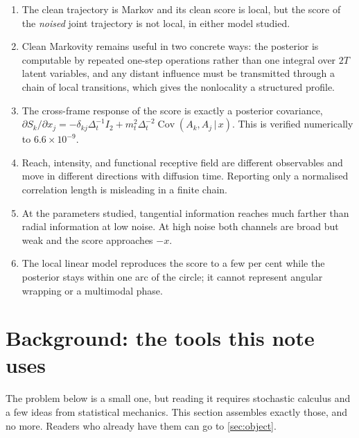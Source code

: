 \documentclass[11pt,a4paper]{article}
\newcommand{\given}{\,\vert\,}
\newcommand{\mt}{m_t}
\newcommand{\Dt}{\Delta_t}
\newcommand{\Cov}{\operatorname{Cov}}
\begin{document}
\begin{keyresult}
\begin{enumerate}[itemsep=0.15em]
\item The clean trajectory is Markov and its clean score is local, but the score of the
      \emph{noised} joint trajectory is not local, in either model studied.
\item Clean Markovity remains useful in two concrete ways: the posterior is computable by
      repeated one-step operations rather than one integral over $2T$ latent variables, and
      any distant influence must be transmitted through a chain of local transitions, which
      gives the nonlocality a structured profile.
\item The cross-frame response of the score is exactly a posterior covariance,
      $\partial S_k/\partial x_j=-\delta_{kj}\Dt^{-1}I_2+\mt^2\Dt^{-2}\Cov(A_k,A_j\given x)$.
      This is verified numerically to $6.6\times10^{-9}$.
\item Reach, intensity, and functional receptive field are different observables and move in
      different directions with diffusion time. Reporting only a normalised correlation
      length is misleading in a finite chain.
\item At the parameters studied, tangential information reaches much farther than radial
      information at low noise. At high noise both channels are broad but weak and the score
      approaches $-x$.
\item The local linear model reproduces the score to a few per cent while the posterior stays
      within one arc of the circle; it cannot represent angular wrapping or a multimodal
      phase.
\end{enumerate}
\end{keyresult}

\setcounter{tocdepth}{2}
\tableofcontents
\clearpage
{}

\section{Background: the tools this note uses}\label{sec:background}

The problem below is a small one, but reading it requires stochastic calculus and a few ideas
from statistical mechanics. This section assembles exactly those, and no more. Readers who
already have them can go to \cref{sec:object}.
\end{document}
